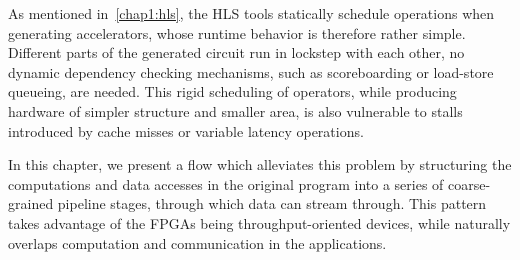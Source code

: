 \label{decoupleChap}


As mentioned in~\ref{chap1:hls}, the HLS tools statically schedule
operations when generating accelerators, whose runtime behavior
is therefore rather simple. Different parts
of the generated circuit run in lockstep with each other, no dynamic dependency checking mechanisms,
such as scoreboarding or load-store queueing, are needed.
This rigid scheduling of operators, while producing hardware of simpler structure and smaller area,
is also vulnerable to stalls introduced by cache misses or variable latency operations.

In this chapter, we present a flow which alleviates this problem by structuring the
computations and data accesses in the original program into a series of coarse-grained pipeline stages, through which data can stream through. This pattern takes advantage
of the FPGAs being throughput-oriented devices, while naturally overlaps computation and
communication in the applications.


